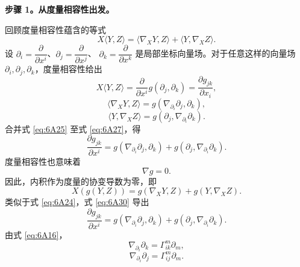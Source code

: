 \noindent\textbf{步骤 1。从度量相容性出发。}\par
回顾度量相容性蕴含的等式
\begin{equation*}
  X\langle Y,Z\rangle=\langle\nabla_XY,Z\rangle+\langle Y,\nabla_XZ\rangle.
  \tag{6A24}\label{eq:6A24}
\end{equation*}
设 $\partial_i=\dfrac{\partial}{\partial x^i}$、$\partial_j=\dfrac{\partial}{\partial x^j}$、
$\partial_k=\dfrac{\partial}{\partial x^k}$ 是局部坐标向量场。对于任意这样的向量场 $\partial_i,\partial_j,\partial_k$，度量相容性给出
\begin{equation*}
  X\langle Y,Z\rangle=\frac{\partial}{\partial x^i}g(\partial_j,\partial_k)
    =\frac{\partial g_{jk}}{\partial x_i},
  \tag{6A25}\label{eq:6A25}
\end{equation*}
\begin{equation*}
  \langle\nabla_XY,Z\rangle=g(\nabla_{\partial_i}\partial_j,\partial_k),
  \tag{6A26}\label{eq:6A26}
\end{equation*}
\begin{equation*}
  \langle Y,\nabla_XZ\rangle=g(\partial_j,\nabla_{\partial_i}\partial_k).
  \tag{6A27}\label{eq:6A27}
\end{equation*}
合并式 \eqref{eq:6A25} 至式 \eqref{eq:6A27}，得
\begin{equation*}
  \frac{\partial g_{jk}}{\partial x^i}
    =g(\nabla_{\partial_i}\partial_j,\partial_k)
     +g(\partial_j,\nabla_{\partial_i}\partial_k).
  \tag{6A28}\label{eq:6A28}
\end{equation*}
度量相容性也意味着
\begin{equation*}
  \nabla g=0.
  \tag{6A29}\label{eq:6A29}
\end{equation*}
因此，内积作为度量的协变导数为零，即
\begin{equation*}
  X(g(Y,Z))=g(\nabla_XY,Z)+g(Y,\nabla_XZ).
  \tag{6A30}\label{eq:6A30}
\end{equation*}
类似于式 \eqref{eq:6A24}，式 \eqref{eq:6A30} 导出
\begin{equation*}
  \frac{\partial g_{jk}}{\partial x^i}
    =g(\nabla_{\partial_i}\partial_j,\partial_k)
     +g(\partial_j,\nabla_{\partial_i}\partial_k).
  \tag{6A31}\label{eq:6A31}
\end{equation*}
由式 \eqref{eq:6A16}，
\begin{equation*}
  \nabla_{\partial_i}\partial_k=\Gamma^m_{ik}\partial_m,
  \tag{6A32}\label{eq:6A32}
\end{equation*}
\begin{equation*}
  \nabla_{\partial_i}\partial_j=\Gamma^m_{ij}\partial_m.
  \tag{6A33}\label{eq:6A33}
\end{equation*}
